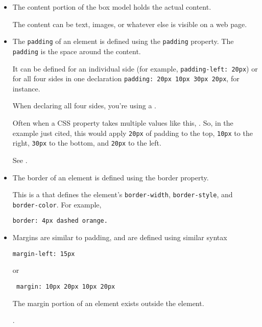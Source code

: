 \begin{itemize}
\item
{} 

The content portion of the box model holds the actual content. 

The content can be text, images, or
whatever else is visible on a web page.

\item
{}

The \verb|padding| of an element is defined using the \verb|padding| property. The \verb|padding| is the space around the content. 

It can be defined for an individual side 
(for example, \verb|padding-left: 20px|) or
for all four sides in one declaration
\verb|padding: 20px 10px 30px 20px|, for instance. 

When declaring all four sides, you’re using a . 

Often when a CSS property takes multiple values like this, . 
So, in the example just cited, this would apply \verb|20px| of padding to the
top, \verb|10px| to the right, \verb|30px| to the bottom, and \verb|20px| to the left.

  See .
\item
{} 

The border of an element is defined using the border property. 

This is a  that defines the element's \verb|border-width|, \verb|border-style|, and \verb|border-color|. For example, 
\begin{verbatim}
border: 4px dashed orange.
\end{verbatim}

\item
{} 

Margins are similar to padding, and are defined using similar syntax 

\begin{verbatim}
margin-left: 15px
\end{verbatim}
or
\begin{verbatim}
 margin: 10px 20px 10px 20px
\end{verbatim}
The margin portion of an element exists outside the element. 

.
\end{itemize}

